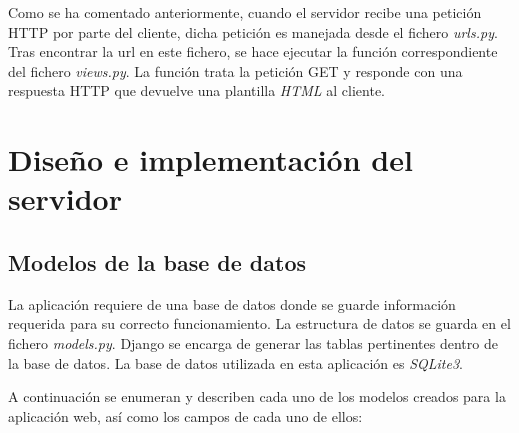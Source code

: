 \documentclass[a4paper, 12pt]{book}
\begin{document}
Como se ha comentado anteriormente, cuando el servidor recibe una petición HTTP por parte del cliente, dicha petición es manejada desde el fichero \textit{urls.py}. Tras encontrar la url en este fichero, se hace ejecutar la función correspondiente del fichero \textit{views.py}. La función trata la petición GET y  responde con una respuesta HTTP que devuelve una plantilla \textit{HTML} al cliente.


\section{Diseño e implementación del servidor} 
\label{sec:diseno-servidor}

\subsection{Modelos de la base de datos} 
\label{subsec:modelo-base-datos}

La aplicación requiere de una base de datos donde se guarde información requerida para su correcto funcionamiento. La estructura de datos se guarda en el fichero \textit{models.py}. Django se encarga de generar las tablas pertinentes dentro de la base de datos. La base de datos utilizada en esta aplicación es \textit{SQLite3}.
\newline

A continuación se enumeran y describen cada uno de los modelos creados para la aplicación web, así como los campos de cada uno de ellos:
\end{document}
